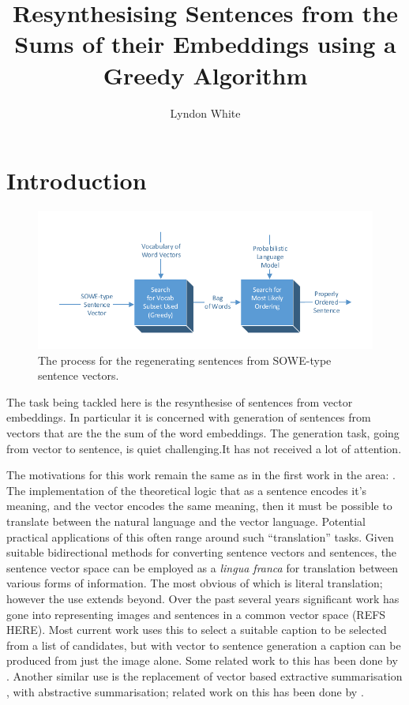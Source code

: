 \documentclass[]{scrartcl}
\title{Resynthesising Sentences from the Sums of their Embeddings using a Greedy Algorithm}
\author{Lyndon White}
\numberwithin{equation}{section}
\numberwithin{figure}{section}
\theoremstyle{plain}
\theoremstyle{definition}
\begin{document}
\maketitle

\begin{abstract}

\end{abstract}

\section{Introduction}


\begin{figure}
	\centering 
	\includegraphics{block_diagram}
	\caption{The process for the regenerating sentences from SOWE-type sentence vectors.}
	\label{block_diagram}
\end{figure}
The task being tackled here is the resynthesise of sentences from vector embeddings. In particular it is concerned with generation of sentences from vectors that are the the sum of the word embeddings. The generation task, going from vector to sentence, is quiet challenging.It has not received a lot of attention.

The motivations for this work remain the same as in the first work in the area: \cite{Dinu2014CompositionalGeneration}. The implementation of the theoretical logic that as a sentence encodes it's meaning, and the vector encodes the same meaning, then it must be possible to translate between the natural language and the vector language. Potential practical applications of this often range around such ``translation'' tasks.
Given suitable bidirectional methods for converting sentence vectors and sentences, the sentence vector space can be employed as a \emph{lingua franca} for translation between various forms of information. The most obvious of which is literal translation; however the use extends beyond. Over the past several years significant work has gone into representing images and sentences in a common vector space (REFS HERE). Most current work uses this to select a suitable caption to be selected from a list of candidates, but with vector to sentence generation a caption can be produced from just the image alone. Some related work to this has been done by \cite{Mao2014GenerateImageDesc}.
 Another similar use is the replacement of vector based extractive summarisation \cite{KaagebExtractiveSummaristation,yogatamaextractive}, with abstractive summarisation; related work on this has been done by \cite{TarasovGenerateAbstractSummary}.
\end{document}
